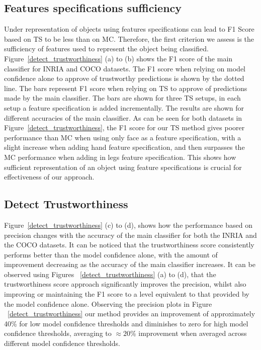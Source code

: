 \subsection{Features specifications sufficiency}
Under representation of objects using features specifications can lead to F1 Score based on TS to be less than on MC. Therefore, the first criterion we assess is the sufficiency of features used to represent the object being classified.
%
Figure~\ref{detect_trustworthiness} (a) to (b) shows the F1 score of the main classifier for INRIA and COCO datasets. The F1 score when relying on model confidence alone to approve of trustworthy predictions is shown by the dotted line. The bars represent F1 score when relying on TS to approve of predictions made by the main classifier. The bars are shown for three TS setups, in each setup a feature specification is added incrementally. 
%
The results are shown for different accuracies of the main classifier. 
%
As can be seen for both datasets in Figure~\ref{detect_trustworthiness}, the F1 score for our TS method gives poorer performance than MC when using only face as a feature specification, with a slight increase when adding hand feature specification, and then surpasses the MC performance when adding in legs feature specification. 
%
This shows how sufficient representation of an object using feature specifications is crucial for effectiveness of our approach.

\subsection{Detect Trustworthiness}
Figure~\ref{detect_trustworthiness} (c) to (d), shows how the performance based on precision changes with the accuracy of the main classifier for both the INRIA and the COCO datasets. It can be noticed that the trustworthiness score consistently performs better than the model confidence alone, with the amount of improvement decreasing as the accuracy of the main classifier increases. 
%
It can be observed using Figures ~\ref{detect_trustworthiness} (a) to (d), that the trustworthiness score approach significantly improves the precision, whilst also improving or maintaining the F1 score to a level equivalent to that provided by the model confidence alone.  
%
Observing the precision plots in Figure ~\ref{detect_trustworthiness} our method provides an improvement of approximately 40\% for low model confidence thresholds and diminishes to zero for high model confidence thresholds, averaging to $\approx 20$\% improvement when averaged across different model confidence thresholds.

